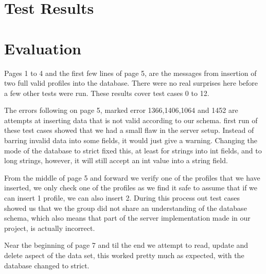


 
 \part*{Test Results}
  
 \part*{Evaluation}
 \normalsize
    Pages 1 to 4 and the first few lines of page 5, are the messages from insertion of two
    full valid profiles into the database. There were no real surprises here before a few other tests were run.
    These results cover test cases 0 to 12.\newline
    
    The errors following on page 5, marked error 1366,1406,1064 and 1452 are attempts at inserting data that is not valid
    according to our schema. first run of these test cases showed that we had a small flaw in the server setup.
    Instead of barring invalid data into some fields, it would just give a warning. Changing the mode of the database to strict fixed this,
    at least for strings into int fields, and to long strings, however, it will still accept an int value into a string field. \newline
    
    From the middle of page 5 and forward we verify one of the profiles that we have inserted, we only check one 
    of the profiles as we find it safe to assume that if we can insert 1 profile, we can also insert 2.
    During this process out test cases showed us that we the group did not share an understanding of the database schema, which
    also means that part of the server implementation made in our project, is actually incorrect.\newline
   
    Near the beginning of page 7 and til the end we attempt to read, update and delete aspect of the data set,
    this worked pretty much as expected, with the database changed to strict.\newline
  



